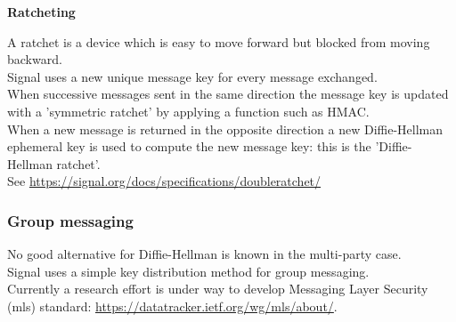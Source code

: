 \documentclass{article}
\begin{document}
\textbf{Ratcheting}

A ratchet is a device which is easy to move forward but blocked from moving backward.\\
Signal uses a new unique message key for every message exchanged.\\
When successive messages sent in the same direction the message key is updated with a 'symmetric ratchet' by applying a function such as HMAC.\\
When a new message is returned in the opposite direction a new Diffie-Hellman ephemeral key is used to compute the new message key: this is the 'Diffie-Hellman ratchet'.\\
See \href{https://signal.org/docs/specifications/doubleratchet/}{https://signal.org/docs/specifications/doubleratchet/}

\subsubsection{Group messaging}

No good alternative for Diffie-Hellman is known in the multi-party case.\\
Signal uses a simple key distribution method for group messaging.\\
Currently a research effort is under way to develop Messaging Layer Security (mls) standard: \href{https://datatracker.ietf.org/wg/mls/about/}{https://datatracker.ietf.org/wg/mls/about/}.

\newpage
{}
\printbibliography


\end{document}
